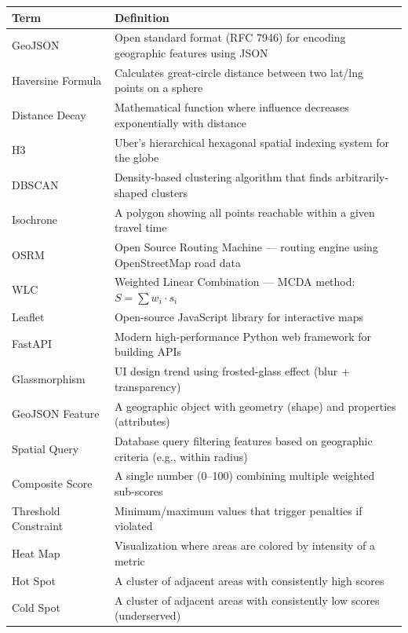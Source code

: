 \documentclass[12pt, a4paper]{article}
\begin{document}
\begin{longtable}{@{} p{4cm} p{12cm} @{}}
    \toprule
    \textbf{Term} & \textbf{Definition} \\
    \midrule
    \endhead
    GeoJSON           & Open standard format (RFC 7946) for encoding geographic features using JSON \\[4pt]
    Haversine Formula & Calculates great-circle distance between two lat/lng points on a sphere \\[4pt]
    Distance Decay    & Mathematical function where influence decreases exponentially with distance \\[4pt]
    H3                & Uber's hierarchical hexagonal spatial indexing system for the globe \\[4pt]
    DBSCAN            & Density-based clustering algorithm that finds arbitrarily-shaped clusters \\[4pt]
    Isochrone         & A polygon showing all points reachable within a given travel time \\[4pt]
    OSRM              & Open Source Routing Machine — routing engine using OpenStreetMap road data \\[4pt]
    WLC               & Weighted Linear Combination — MCDA method: $S = \sum w_i \cdot s_i$ \\[4pt]
    Leaflet           & Open-source JavaScript library for interactive maps \\[4pt]
    FastAPI           & Modern high-performance Python web framework for building APIs \\[4pt]
    Glassmorphism     & UI design trend using frosted-glass effect (blur + transparency) \\[4pt]
    GeoJSON Feature   & A geographic object with geometry (shape) and properties (attributes) \\[4pt]
    Spatial Query     & Database query filtering features based on geographic criteria (e.g., within radius) \\[4pt]
    Composite Score   & A single number (0--100) combining multiple weighted sub-scores \\[4pt]
    Threshold Constraint & Minimum/maximum values that trigger penalties if violated \\[4pt]
    Heat Map          & Visualization where areas are colored by intensity of a metric \\[4pt]
    Hot Spot          & A cluster of adjacent areas with consistently high scores \\[4pt]
    Cold Spot         & A cluster of adjacent areas with consistently low scores (underserved) \\[4pt]

\end{longtable}
\end{document}
